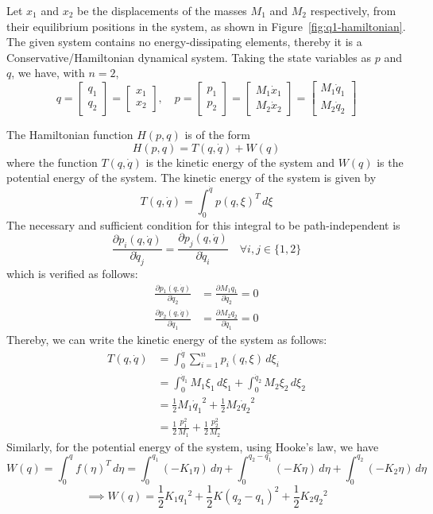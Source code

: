 Let \(x_1\) and \(x_2\) be the displacements of the masses \(M_1\) and \(M_2\) respectively, from their equilibrium positions in the system, as shown in Figure~\ref{fig:q1-hamiltonian}.
The given system contains no energy-dissipating elements, thereby it is a Conservative/Hamiltonian dynamical system.
Taking the state variables as \(p\) and \(q\), we have, with \(n=2\),
\[
    q = \begin{bmatrix} q_1 \\ q_2 \end{bmatrix} = \begin{bmatrix} x_1 \\ x_2 \end{bmatrix},
    \quad
    p = \begin{bmatrix} p_1 \\ p_2 \end{bmatrix} = \begin{bmatrix} M_1 \dot x_1 \\ M_2 \dot x_2 \end{bmatrix} = \begin{bmatrix} M_1 \dot q_1 \\ M_2 \dot q_2 \end{bmatrix}
\]

The Hamiltonian function \(H(p,q)\) is of the form
\[
    H(p,q) = T(q, \dot q) + W(q)
    \tag{1.1}
\]
where the function \(T(q, \dot q)\) is the kinetic energy of the system and \(W(q)\) is the potential energy of the system.
The kinetic energy of the system is given by
\[
    T(q, \dot q) = \int_{0}^{\dot q} {p(q, \xi)}^T \, d\xi
\]
The necessary and sufficient condition for this integral to be path-independent is
\[
    \frac{\partial p_i(q, \dot q)}{\partial \dot q_j} = \frac{\partial p_j(q, \dot q)}{\partial \dot q_i} \quad \forall i,j \in \{1,2\}
\]
which is verified as follows:
\begin{align*}
    \frac{\partial p_1(q, \dot q)}{\partial \dot q_2}
     & =
    \frac{\partial M_1 q_1}{\partial \dot q_2} = 0 \\
    \frac{\partial p_2(q, \dot q)}{\partial \dot q_1}
     & =
    \frac{\partial M_2 q_2}{\partial \dot q_1} = 0
\end{align*}
Thereby, we can write the kinetic energy of the system as follows:
\begin{align*}
    T(q, \dot q)
     & =
    \int_{0}^{\dot q} \sum_{i=1}^{n} p_i(q, \xi) \, d\xi_i
    \\ & =
    \int_{0}^{\dot q_1} M_1 \xi_1 \, d\xi_1
    + \int_{0}^{\dot q_2} M_2 \xi_2 \, d\xi_2
    \\ & =
    \frac{1}{2} M_1 {\dot q_1}^2
    + \frac{1}{2} M_2 {\dot q_2}^2
    \\ & =
    \frac{1}{2} \frac{p_1^2}{M_1}
    + \frac{1}{2} \frac{p_2^2}{M_2}
    \tag{1.2}
\end{align*}
Similarly, for the potential energy of the system, using Hooke's law, we have
\[
    W(q) = \int_{0}^{q} {f(\eta)}^T \, d\eta
    = \int_{0}^{q_1} (-K_1 \eta)\, d\eta
    + \int_{0}^{q_2 - q_1} (-K \eta)\, d\eta
    + \int_{0}^{q_2} (-K_2 \eta)\, d\eta
\]
\[
    \implies
    W(q) = \frac{1}{2} K_1 {q_1}^2 + \frac{1}{2} K {(q_2 - q_1)}^2 + \frac{1}{2} K_2 {q_2}^2
    \tag{1.3}
\]

